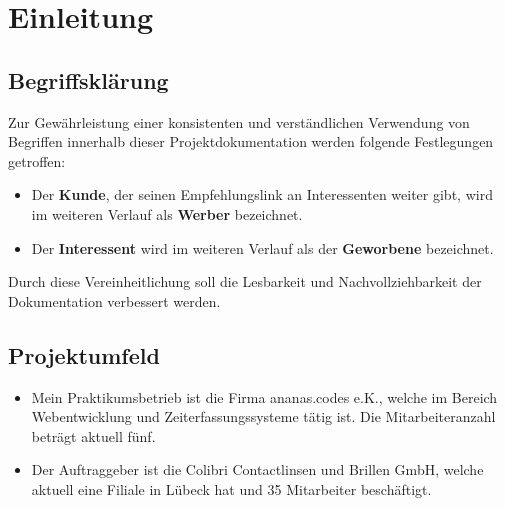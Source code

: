 \section{Einleitung}
\label{sec:Einleitung}

\subsection{Begriffsklärung}
\label{sec:Begriffsklaerung}
Zur Gewährleistung einer konsistenten und verständlichen Verwendung von Begriffen innerhalb dieser Projektdokumentation werden folgende Festlegungen getroffen:
\begin{itemize}
    \item Der \textbf{Kunde}, der seinen Empfehlungslink an Interessenten weiter gibt, wird im weiteren Verlauf als \textbf{Werber} bezeichnet.
    \item Der \textbf{Interessent} wird im weiteren Verlauf als der \textbf{Geworbene} bezeichnet.
\end{itemize}
Durch diese Vereinheitlichung soll die Lesbarkeit und Nachvollziehbarkeit der Dokumentation verbessert werden.

\subsection{Projektumfeld} 
\label{sec:Projektumfeld}
\begin{itemize}
	\item Mein Praktikumsbetrieb ist die Firma ananas.codes e.K., welche im Bereich Webentwicklung und Zeiterfassungssysteme tätig ist. Die Mitarbeiteranzahl beträgt aktuell fünf.
	\item Der Auftraggeber ist die Colibri Contactlinsen und Brillen GmbH, welche aktuell eine Filiale in Lübeck hat und 35 Mitarbeiter beschäftigt.
\end{itemize}


